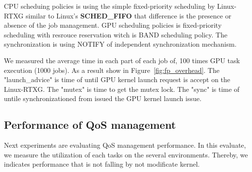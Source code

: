 CPU scheduing policies is using the simple fixed-priority scheduling by Linux-RTXG similar to Linux's \textbf{SCHED\_FIFO} that difference is the presence or absence of the job management.
GPU scheduling policies is fixed-priority scheduling with resrouce reservation witch is BAND scheduling policy.
The synchronization is using NOTIFY of independent synchronization mechanism.

We measured the average time in each part of each job of, 100 times GPU task execution (1000 jobs).
As a result show in Figure~\ref{fig:fp_overhead}.
The "launch\_advice" is time of until GPU kernel launch request is accept on the Linux-RTXG.
The "mutex" is time to get the mutex lock.
The "sync" is time of untile synchronizationed from issued the GPU kernel launch issue.




%




\subsection{Performance of QoS management}
Next experiments are evaluating QoS management performance.
In this evaluate, we measure the utilization of each tasks on the several environments.
Thereby, we indicates performance that is not falling by not modificate kernel.

